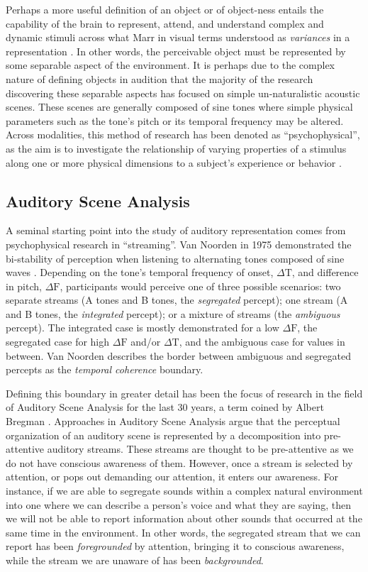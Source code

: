 Perhaps a more useful definition of an object or of object-ness entails the capability of the brain to represent, attend, and understand complex and dynamic stimuli across what Marr in visual terms understood as \textit{variances} in a representation \cite{Marr1982}.  In other words, the perceivable object must be represented by some separable aspect of the environment.   It is perhaps due to the complex nature of defining objects in audition that the majority of the research discovering these separable aspects has focused on simple un-naturalistic acoustic scenes.  These scenes are generally composed of sine tones where simple physical parameters such as the tone's pitch or its temporal frequency may be altered.  Across modalities, this method of research has been denoted as ``psychophysical'', as the aim is to investigate the relationship of varying properties of a stimulus along one or more physical dimensions to a subject's experience or behavior \cite{}. 

\subsection{Auditory Scene Analysis}

A seminal starting point into the study of auditory representation comes from psychophysical research in ``streaming''.  Van Noorden in 1975 demonstrated the bi-stability of perception when listening to alternating tones composed of sine waves \cite{Noorden1975}.  Depending on the tone's temporal frequency of onset, $\Delta \text{T}$, and difference in pitch, $\Delta \text{F}$, participants would perceive one of three possible scenarios: two separate streams (A tones and B tones, the \textit{segregated} percept); one stream (A and B tones, the \textit{integrated} percept); or a mixture of streams (the \textit{ambiguous} percept).  The integrated case is mostly demonstrated for a low $\Delta \text{F}$, the segregated case for high $\Delta \text{F}$ and/or $\Delta \text{T}$, and the ambiguous case for values in between.  Van Noorden describes the border between ambiguous and segregated percepts as the \textit{temporal coherence} boundary.  

Defining this boundary in greater detail has been the focus of research in the field of Auditory Scene Analysis for the last 30 years, a term coined by Albert Bregman \cite{Bregman1990}.  Approaches in Auditory Scene Analysis argue that the perceptual organization of an auditory scene is represented by a decomposition into pre-attentive auditory streams.  These streams are thought to be pre-attentive as we do not have conscious awareness of them.  However, once a stream is selected by attention, or pops out demanding our attention, it enters our awareness.  For instance, if we are able to segregate sounds within a complex natural environment into one where we can describe a person's voice and what they are saying, then we will not be able to report information about other sounds that occurred at the same time in the environment.  In other words, the segregated stream that we can report has been \textit{foregrounded} by attention, bringing it to conscious awareness, while the stream we are unaware of has been \textit{backgrounded}.  

